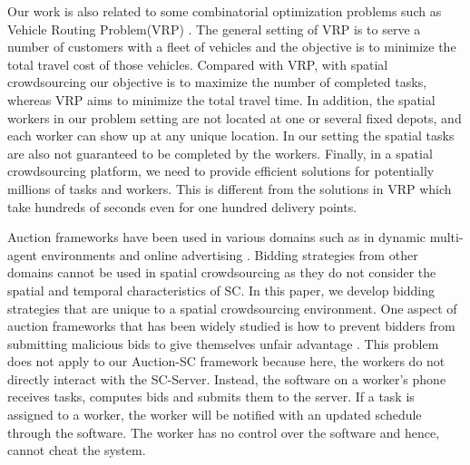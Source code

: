Our work is also related to some combinatorial optimization problems such as Vehicle Routing Problem(VRP) \cite{Braysy05}. The general setting of VRP is to serve a number of customers with a fleet of vehicles and the objective is to minimize the total travel cost of those vehicles. Compared with VRP, with spatial crowdsourcing our objective is to maximize the number of completed tasks, whereas VRP aims to minimize the total travel time. In addition, the spatial workers in our problem setting are not located at one or several fixed depots, and each worker can show up at any unique location. In our setting the spatial tasks are also not guaranteed to be completed by the workers. Finally, in a spatial crowdsourcing platform, we need to provide efficient solutions for potentially millions of tasks and workers. This is different from the solutions in VRP which take hundreds of seconds even for one hundred delivery points.

Auction frameworks have been used in various domains such as in dynamic multi-agent environments \cite{Mehta05,Lagoudakis04} and online advertising \cite{Ghosh10}. Bidding strategies from other domains cannot be used in spatial crowdsourcing as they do not consider the spatial and temporal characteristics of SC. In this paper, we develop bidding strategies that are unique to a spatial crowdsourcing environment. One aspect of auction frameworks that has been widely studied is how to prevent bidders from submitting malicious bids to give themselves unfair advantage \cite{Lavi05}. This problem does not apply to our Auction-SC framework because here, the workers do not directly interact with the SC-Server. Instead, the software on a worker's phone receives tasks, computes bids and submits them to the server. If a task is assigned to a worker, the worker will be notified with an updated schedule through the software. The worker has no control over the software and hence, cannot cheat the system.


